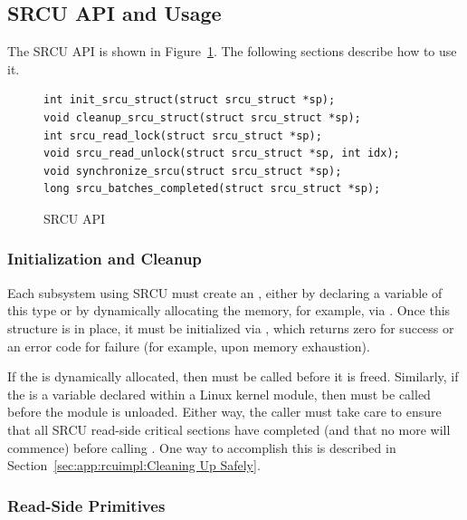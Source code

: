 \subsection{SRCU API and Usage}
\label{sec:app:rcuimpl:SRCU API and Usage}

The SRCU API is shown in Figure~\ref{fig:app:rcuimpl:SRCU API}.
The following sections describe how to use it.

\begin{figure}[htbp]
{ \scriptsize
\begin{verbatim}
int init_srcu_struct(struct srcu_struct *sp);
void cleanup_srcu_struct(struct srcu_struct *sp);
int srcu_read_lock(struct srcu_struct *sp);
void srcu_read_unlock(struct srcu_struct *sp, int idx);
void synchronize_srcu(struct srcu_struct *sp);
long srcu_batches_completed(struct srcu_struct *sp);
\end{verbatim}
}
\caption{SRCU API}
\label{fig:app:rcuimpl:SRCU API}
\end{figure}

\subsubsection{Initialization and Cleanup}
\label{sec:app:rcuimpl:Initialization and Cleanup}

Each subsystem using SRCU must create an
 ,
either by declaring a variable of this type or by
dynamically allocating the memory, for example, via .
Once this structure is in place, it must be initialized via
, which returns zero for success or an error
code for failure (for example, upon memory exhaustion).

If the   is dynamically allocated, then
 must be called before it is freed.
Similarly, if the   is a variable declared within
a Linux kernel module, then  must be called
before the module is unloaded.
Either way, the caller must take care to ensure that all SRCU read-side
critical sections have completed (and that no more will commence) before
calling .
One way to accomplish this is described in
Section~\ref{sec:app:rcuimpl:Cleaning Up Safely}.

\subsubsection{Read-Side Primitives}
\label{sec:app:rcuimpl:Read-Side Primitives}

